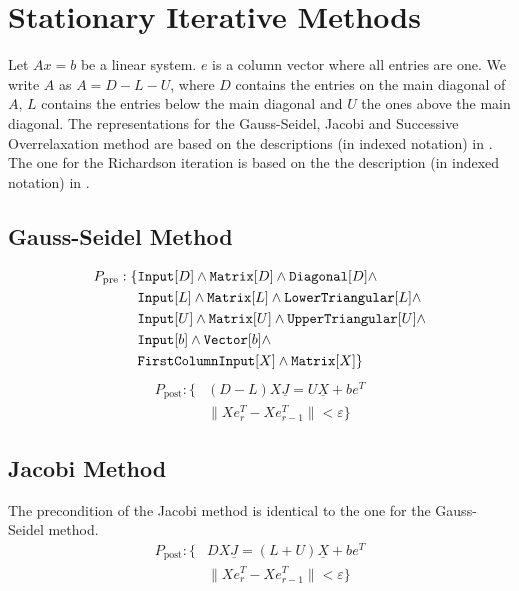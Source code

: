 \section{Stationary Iterative Methods}
\label{sec:stationaryIterative}

Let $Ax = b$ be a linear system. $e$ is a column vector where all entries are one. We write $A$ as $A = D - L - U$, where $D$ contains the entries on the main diagonal of $A$, $L$ contains the entries below the main diagonal and $U$ the ones above the main diagonal. The representations for the Gauss-Seidel, Jacobi and Successive Overrelaxation method are based on the descriptions (in indexed notation) in \cite{barrett:templates}. The one for the Richardson iteration is based on the the description (in indexed notation) in \cite{eijkhout:CGderivation}.
%
\subsection{Gauss-Seidel Method}
%
\begin{align*}
P_\text{pre}: \{ &\text{\ttfamily Input}[D] \land \text{\ttfamily Matrix}[D] \land \text{\ttfamily Diagonal}[D] \land \\
		&\text{\ttfamily Input}[L] \land \text{\ttfamily Matrix}[L] \land \text{\ttfamily LowerTriangular}[L] \land \\
		&\text{\ttfamily Input}[U] \land \text{\ttfamily Matrix}[U] \land \text{\ttfamily UpperTriangular}[U] \land \\
		&\text{\ttfamily Input}[b] \land \text{\ttfamily Vector}[b] \land \\
		&\text{\ttfamily FirstColumnInput}[X] \land \text{\ttfamily Matrix}[X] \}
\end{align*}
%
\begin{align*}
P_\text{post}:	\{ 	&(D - L) X \underline{J} = U \underline{X} + be^T \\
				& \| X e_r^T - X e_{r-1}^T \| < \varepsilon \}
\end{align*}
%
\subsection{Jacobi Method}
%
The precondition of the Jacobi method is identical to the one for the Gauss-Seidel method.
%
\begin{align*}
P_\text{post}:	\{ 	&D X \underline{J} = ( L + U ) \underline{X} + be^T \\
				& \| X e_r^T - X e_{r-1}^T \| < \varepsilon \}
\end{align*}
%
